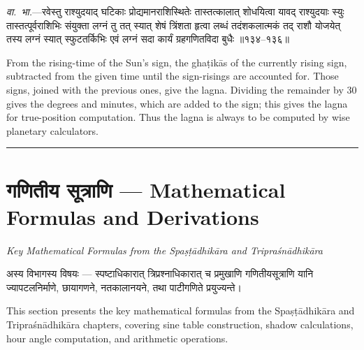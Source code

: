 \documentclass[11pt,a4paper]{article}
\newcommand{\longline}{\noindent\rule{\textwidth}{0.4pt}}
\newcommand{\dev}[1]{{\devanagarifont #1}}
\newcommand{\sectsep}{\par\vspace{0.8em}\longline\vspace{0.8em}}
\begin{document}
\vspace{0.5em}
\begin{minipage}[t]{0.48\textwidth}
\small\devanagarifont
\textit{वा.~भा.}---रवेस्तु राश्युदयाद् घटिकाः प्रोद्यमानराशिस्थितेः तास्तत्कालात् शोधयित्वा यावद् राश्युदयाः स्युः तास्तत्पूर्वराशिभिः संयुक्ता लग्नं तु तत् स्यात् शेषं त्रिंशता हृत्वा लब्धं तदंशकलात्मकं तद् राशौ योजयेत् तस्य लग्नं स्यात् स्फुटतर्किभिः एवं लग्नं सदा कार्यं ग्रहगणितविदा बुधैः ॥१३४--१३६॥
\end{minipage}%
\hfill
\begin{minipage}[t]{0.48\textwidth}
\small
From the rising-time of the Sun's sign, the gha\d{t}ik\=as of the currently rising sign, subtracted from the given time until the sign-risings are accounted for. Those signs, joined with the previous ones, give the lagna. Dividing the remainder by 30 gives the degrees and minutes, which are added to the sign; this gives the lagna for true-position computation. Thus the lagna is always to be computed by wise planetary calculators.
\end{minipage}

\sectsep

\section{\dev{गणितीय सूत्राणि --- Mathematical Formulas and Derivations}}

\begin{center}
\textit{Key Mathematical Formulas from the Spa\d{s}\d{t}\=adhik\=ara and Tripra\'sn\=adhik\=ara}
\end{center}

\begin{minipage}[t]{0.48\textwidth}
\small\devanagarifont
अस्य विभागस्य विषयः --- स्पष्टाधिकारात् त्रिप्रश्नाधिकारात् च प्रमुखाणि गणितीयसूत्राणि यानि ज्यापटलनिर्माणे, छायागणने, नतकालानयने, तथा पाटीगणिते प्रयुज्यन्ते।
\end{minipage}%
\hfill
\begin{minipage}[t]{0.48\textwidth}
\small
This section presents the key mathematical formulas from the Spa\d{s}\d{t}\=adhik\=ara and Tripra\'sn\=adhik\=ara chapters, covering sine table construction, shadow calculations, hour angle computation, and arithmetic operations.
\end{minipage}
\end{document}
